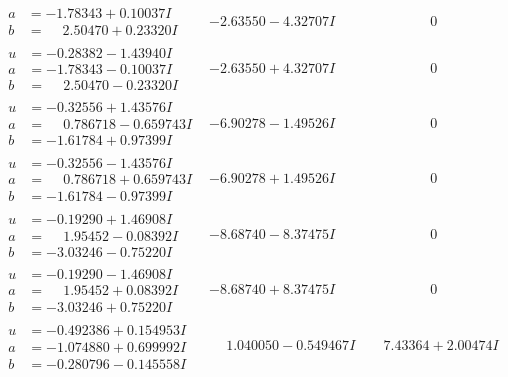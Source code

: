 \documentclass[1p]{elsarticle_modified}
\theoremstyle{definition}
\begin{document}
$$\begin{array}{c|c|c}
\begin{aligned}
a &= -1.78343 + 0.10037 I \\
b &= \phantom{-}2.50470 + 0.23320 I\end{aligned}
 & -2.63550 - 4.32707 I & \phantom{-0.000000 } 0 \\ \hline\begin{aligned}
u &= -0.28382 - 1.43940 I \\
a &= -1.78343 - 0.10037 I \\
b &= \phantom{-}2.50470 - 0.23320 I\end{aligned}
 & -2.63550 + 4.32707 I & \phantom{-0.000000 } 0 \\ \hline\begin{aligned}
u &= -0.32556 + 1.43576 I \\
a &= \phantom{-}0.786718 - 0.659743 I \\
b &= -1.61784 + 0.97399 I\end{aligned}
 & -6.90278 - 1.49526 I & \phantom{-0.000000 } 0 \\ \hline\begin{aligned}
u &= -0.32556 - 1.43576 I \\
a &= \phantom{-}0.786718 + 0.659743 I \\
b &= -1.61784 - 0.97399 I\end{aligned}
 & -6.90278 + 1.49526 I & \phantom{-0.000000 } 0 \\ \hline\begin{aligned}
u &= -0.19290 + 1.46908 I \\
a &= \phantom{-}1.95452 - 0.08392 I \\
b &= -3.03246 - 0.75220 I\end{aligned}
 & -8.68740 - 8.37475 I & \phantom{-0.000000 } 0 \\ \hline\begin{aligned}
u &= -0.19290 - 1.46908 I \\
a &= \phantom{-}1.95452 + 0.08392 I \\
b &= -3.03246 + 0.75220 I\end{aligned}
 & -8.68740 + 8.37475 I & \phantom{-0.000000 } 0 \\ \hline\begin{aligned}
u &= -0.492386 + 0.154953 I \\
a &= -1.074880 + 0.699992 I \\
b &= -0.280796 - 0.145558 I\end{aligned}
 & \phantom{-}1.040050 - 0.549467 I & \phantom{-}7.43364 + 2.00474 I \\ \hline\begin{aligned}

\end{aligned}
\end{array}$$
\end{document}
